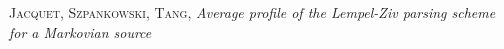 
\versionAuteur

\def\changemargin#1#2{\list{}{\rightmargin#2\leftmargin#1}\item[]}
\let\endchangemargin=\endlist 
\usepackage{booktabs}
\usepackage{pdfpages}
\setlength{\parindent}{0cm}

\DeclareRobustCommand{\rchi}{{\mathpalette\irchi\relax}}
\newcommand{\irchi}[2]{\raisebox{\depth}{$#1\chi$}}

\usepackage{pdfpages}
\usepackage{hyperref}







\begin{thebibliography}{9}

        \textsc{Jacquet}, \textsc{Szpankowski}, \textsc{Tang},
        \textit{Average profile of the Lempel-Ziv parsing scheme for a Markovian source}

\end{thebibliography}


